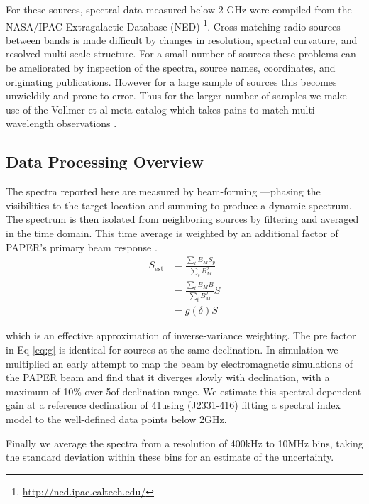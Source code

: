 \documentclass[preprint]{aastex}
\begin{document}
For these sources, spectral data measured below 2 GHz were compiled from 
the NASA/IPAC Extragalactic Database (NED)
\footnote{\url{http://ned.ipac.caltech.edu/}}. Cross-matching radio sources
between bands is made difficult by changes in resolution, spectral curvature,
and resolved multi-scale structure.  For a small number of sources these
problems can be ameliorated by inspection of the spectra, source names,
coordinates,  and originating publications. However for a large sample of
sources this becomes unwieldily and prone to error. Thus for the larger number
of samples we make use of the Vollmer et al meta-catalog which takes pains to
match multi-wavelength observations \citep{Vollmer:2010p6422}.

\subsection*{Data Processing Overview}
\label{sec:data_overview}
The spectra reported here are measured by beam-forming ---phasing the visibilities to
the target location and summing to produce a dynamic spectrum. The spectrum is then isolated
from neighboring sources by filtering and averaged in the time domain.  This time average is 
weighted by an additional factor of PAPER's primary beam response 
\citep{pober_et_al2012}.  
\begin{align}
S_\textrm{est} &= \frac{\sum_t B_M S_p}{\sum_t B^2_M} \nonumber \\ 
&= \frac{\sum_t B_M B}{\sum_t B^2_M} S  \nonumber \\
&= g(\delta) S  \label{eq:g}
\end{align}

which is an effective approximation of inverse-variance weighting. The pre factor in Eq \ref{eq:g} is identical for 
sources at the same declination.  In simulation we multiplied an early attempt to map the beam \cite{Pober:2012p8800}
by electromagnetic simulations of the PAPER beam and find that it 
diverges slowly with declination, with a maximum of 10\% over 5\arcdeg of declination range.
We estimate this spectral dependent gain at a reference declination of 41\arcmin using (J2331-416) fitting a spectral index model to the
 well-defined data points below 2GHz. 
 
 Finally we average the spectra from a resolution of 400kHz to 10MHz bins, taking the standard deviation within these bins
 for an estimate of the uncertainty.
\end{document}
